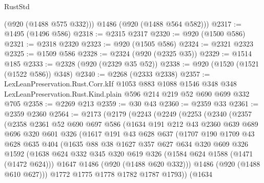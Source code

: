 \begin{lexlean}{RustStd}
\begin{coremodule}
        (@920 (@1488 @575 @332)))
      @1486
      (@920 (@1488 @564 @582)))
@2317 := @1495 (@1496 @586)
@2318 := @2315 @2317
@2320 := @920 (@1500 @586)
@2321 := @2318 @2320
@2323 := @920 (@1505 @586)
@2324 := @2321 @2323
@2325 := @1509 @586
@2328 := @2324 (@920 (@2325 @35))
@2329 := @1514 @185
@2333 := @2328 (@920 (@2329 @35 @52))
@2338 := @920 (@1520 (@1521 (@1522 @586)) @348)
@2340 := @2268 (@2333 @2338)
@2357 := LexLeanPreservation.Rust.Corr.kIf
    @1053
    @883
    @1088
    @1546
    @348
    @348
    LexLeanPreservation.Rust.Kind.plain
    @596
    @214
    @219
    @52
    @690
    @699
    @332
    @705
@2358 := @2269 @213
@2359 := @30 @43
@2360 := @2359 @33
@2361 := @2359 @2360
@2564 := @2173
    (@2179
      (@2243
        (@2249
          (@2253
            (@2340
              (@2357
                (@2358
                  @2361
                  @52
                  @690
                  @697
                  @586
                  (@1634
                    @191
                    @212
                    @43
                    @2360
                    @639
                    @689
                    @696
                    @320
                    @601
                    @326
                    (@1617
                      @191
                      @43
                      @628
                      @637
                      (@1707
                        @190
                        @1709
                        @43
                        @628
                        @635
                        @404
                        (@1635
                          @88
                          @38
                          @1627
                          @357
                          @627
                          @634
                          @320
                          @609
                          @326
                          @1592
                          (@1638
                            @624
                            @332
                            @345
                            @320
                            @619
                            @326
                            (@1584 @624 @1588 (@1471 (@1472 @624)))
                            @1647
                            @1486
                            (@920 (@1488 @620 @332)))
                          @1486
                          (@920 (@1488 @610 @627)))
                        @1772
                        @1775
                        @1778
                        @1782
                        @1787
                        @1793))
                    (@1634

\end{coremodule}
\end{lexlean}
